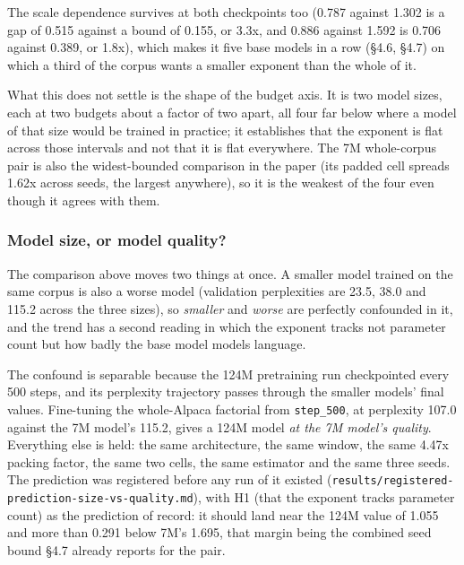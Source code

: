 \documentclass[11pt]{article}
\begin{document}
The scale dependence survives at both checkpoints too (0.787 against 1.302 is a gap of 0.515 against a bound of 0.155, or 3.3x, and 0.886 against 1.592 is 0.706 against 0.389, or 1.8x), which makes it five base models in a row (\S{}4.6, \S{}4.7) on which a third of the corpus wants a smaller exponent than the whole of it.

What this does not settle is the shape of the budget axis. It is two model sizes, each at two budgets about a factor of two apart, all four far below where a model of that size would be trained in practice; it establishes that the exponent is flat across those intervals and not that it is flat everywhere. The 7M whole-corpus pair is also the widest-bounded comparison in the paper (its padded cell spreads 1.62x across seeds, the largest anywhere), so it is the weakest of the four even though it agrees with them.

\subsubsection{Model size, or model quality?}

The comparison above moves two things at once. A smaller model trained on the same corpus is also a worse model (validation perplexities are 23.5, 38.0 and 115.2 across the three sizes), so \emph{smaller} and \emph{worse} are perfectly confounded in it, and the trend has a second reading in which the exponent tracks not parameter count but how badly the base model models language.

The confound is separable because the 124M pretraining run checkpointed every 500 steps, and its perplexity trajectory passes through the smaller models' final values. Fine-tuning the whole-Alpaca factorial from \texttt{step\_\allowbreak{}500}, at perplexity 107.0 against the 7M model's 115.2, gives a 124M model \emph{at the 7M model's quality}. Everything else is held: the same architecture, the same window, the same 4.47x packing factor, the same two cells, the same estimator and the same three seeds. The prediction was registered before any run of it existed (\texttt{results/\allowbreak{}registered-prediction-size-vs-quality.md}), with H1 (that the exponent tracks parameter count) as the prediction of record: it should land near the 124M value of 1.055 and more than 0.291 below 7M's 1.695, that margin being the combined seed bound \S{}4.7 already reports for the pair.
\end{document}
